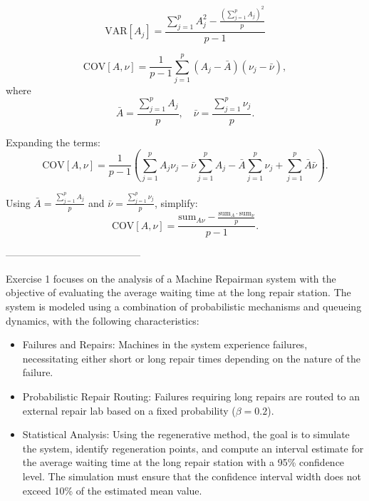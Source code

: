 \documentclass[12pt]{article}
\begin{document}
	\[
	\text{VAR}[A_j] = \frac{\sum_{j=1}^p A_j^2 - \frac{\left(\sum_{j=1}^p A_j \right)^2}{p}}{p-1}
	\]
	
	\[
	\text{COV}[A, \nu] = \frac{1}{p-1} \sum_{j=1}^p \left( A_j - \bar{A} \right) \left( \nu_j - \bar{\nu} \right),
	\]
	where
	\[
	\bar{A} = \frac{\sum_{j=1}^p A_j}{p}, \quad \bar{\nu} = \frac{\sum_{j=1}^p \nu_j}{p}.
	\]
	
	Expanding the terms:
	\[
	\text{COV}[A, \nu] = \frac{1}{p-1} \left( \sum_{j=1}^p A_j \nu_j - \bar{\nu} \sum_{j=1}^p A_j - \bar{A} \sum_{j=1}^p \nu_j + \sum_{j=1}^p \bar{A} \bar{\nu} \right).
	\]
	
	Using \(\bar{A} = \frac{\sum_{j=1}^p A_j}{p}\) and \(\bar{\nu} = \frac{\sum_{j=1}^p \nu_j}{p}\), simplify:
	\[
	\text{COV}[A, \nu] = \frac{\text{sum}_{A\nu} - \frac{\text{sum}_A \cdot \text{sum}_\nu}{p}}{p-1}.
	\]
	
	
	-----------------------------------------
	
	
	Exercise 1 focuses on the analysis of a Machine Repairman system with the objective of evaluating the average waiting time at the long repair station. The system is modeled using a combination of probabilistic mechanisms and queueing dynamics, with the following characteristics:
	
	\begin{itemize}
		\item Failures and Repairs: Machines in the system experience failures, necessitating either short or long repair times depending on the nature of the failure.
		\item Probabilistic Repair Routing: Failures requiring long repairs are routed to an external repair lab based on a fixed probability ($\beta = 0.2$).
		\item Statistical Analysis: Using the regenerative method, the goal is to simulate the system, identify regeneration points, and compute an interval estimate for the average waiting time at the long repair station with a 95\% confidence level. The simulation must ensure that the confidence interval width does not exceed 10\% of the estimated mean value.
	\end{itemize}
	
\end{document}
